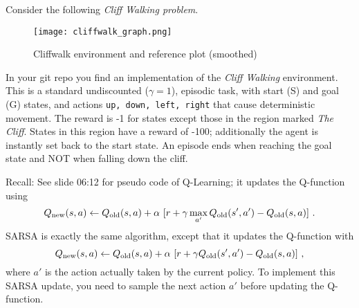 

\renewcommand{\course}{Artificial Intelligence}
\renewcommand{\coursepicture}{course_ai}
\renewcommand{\coursedate}{Winter 2019}
\renewcommand{\exnum}{4}

\exercises


Consider the following \textit{Cliff Walking problem}.

\begin{figure}[ht]
	\centering
        \texttt{[image: cliffwalk\_graph.png]}
        \caption{Cliffwalk environment and reference plot (smoothed)}
\end{figure}

\noindent
In your git repo you find an implementation of the \emph{Cliff
  Walking} environment. This is a standard undiscounted ($\gamma =
1$), episodic task, with start (S) and goal (G) states, and 
actions \texttt{up, down, left, right} that cause deterministic movement.
The reward is -1 for states except those in the region marked
\textit{The Cliff}. States in this region have a reward of -100; additionally the agent is instantly set back to the start state. An episode ends when
reaching the goal state and NOT when falling down the cliff.

Recall: See slide 06:12 for pseudo code of Q-Learning; it updates the Q-function using
$$
Q_{\text{new}}(s,a) \gets Q_{\text{old}}(s,a)
 + \alpha~ [r + \gamma \max_{a'} Q_{\text{old}}(s',a') - Q_{\text{old}}(s,a)] ~.$$
SARSA is exactly the same algorithm, except that it updates the Q-function with
$$Q_{\text{new}}(s,a) \gets Q_{\text{old}}(s,a)
 + \alpha~ [r + \gamma Q_{\text{old}}(s',a') - Q_{\text{old}}(s,a)] ~,$$
where $a'$ is the action actually taken by the current policy. To implement this SARSA update, you need to sample the next action $a'$ before updating the Q-function.

